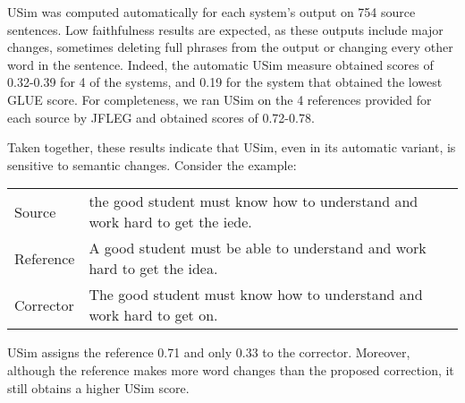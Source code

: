 \documentclass[a4paper, 11pt]{article}
\begin{document}
{\sc USim} was computed automatically for each system's output on 754 source sentences.
Low faithfulness results are expected, as these outputs include major changes,
sometimes deleting full phrases from the output or changing every other word in the sentence.
Indeed, the automatic USim measure obtained scores of 0.32-0.39 for 4 of the systems, and 0.19
for the system that obtained the lowest GLUE\cite{napoles2015ground} score.
For completeness, we ran {\sc USim} on the 4 references provided for each
source by JFLEG and obtained scores of 0.72-0.78.

Taken together, these results indicate that {\sc USim}, even in its automatic variant,
is sensitive to semantic changes. Consider the example: 

\begin{table}[h!]
	\vspace{-.3cm}
  \centering
  \label{ex:sensitive}
  \begin{tabular}{p{}p{}}
    Source    & \small the good student must know how to understand and work hard to get the iede.\\
    Reference & \small A good student must be able to understand and work hard to get the idea.\\
    Corrector & \small The good student must know how to understand and work hard to get on.     
  \end{tabular}
  
  \vspace{-.3cm}
\end{table}

{\sc USim} assigns the reference 0.71 and only 0.33 to the corrector.
Moreover, although the reference makes more word changes than the proposed correction,
it still obtains a higher {\sc USim} score.


%
%
%
\vspace{-.1cm}
\end{document}
